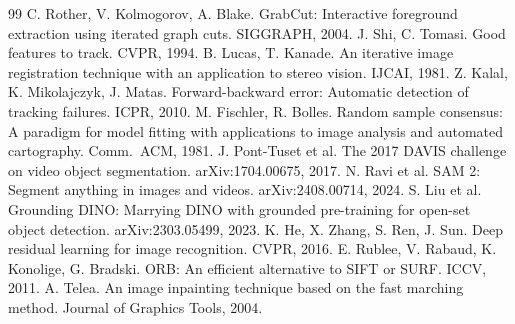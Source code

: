 \documentclass[10pt,letterpaper]{article}
\begin{document}
{\footnotesize
\begin{thebibliography}{99}
\setlength{\itemsep}{0pt}
 C. Rother, V. Kolmogorov, A. Blake. GrabCut: Interactive foreground extraction
using iterated graph cuts. SIGGRAPH, 2004.
 J. Shi, C. Tomasi. Good features to track. CVPR, 1994.
 B. Lucas, T. Kanade. An iterative image registration technique with an application to
stereo vision. IJCAI, 1981.
 Z. Kalal, K. Mikolajczyk, J. Matas. Forward-backward error: Automatic detection of
tracking failures. ICPR, 2010.
 M. Fischler, R. Bolles. Random sample consensus: A paradigm for model fitting with
applications to image analysis and automated cartography. Comm.\ ACM, 1981.
 J. Pont-Tuset et al. The 2017 DAVIS challenge on video object segmentation.
arXiv:1704.00675, 2017.
 N. Ravi et al. SAM 2: Segment anything in images and videos. arXiv:2408.00714, 2024.
 S. Liu et al. Grounding DINO: Marrying DINO with grounded pre-training for open-set
object detection. arXiv:2303.05499, 2023.
 K. He, X. Zhang, S. Ren, J. Sun. Deep residual learning for image recognition.
CVPR, 2016.
 E. Rublee, V. Rabaud, K. Konolige, G. Bradski. ORB: An efficient alternative to SIFT
or SURF. ICCV, 2011.
 A. Telea. An image inpainting technique based on the fast marching method.
Journal of Graphics Tools, 2004.
\end{thebibliography}
}
\end{document}
